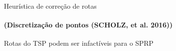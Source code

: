 \documentclass[12pt]{beamer}
\begin{document}
\begin{frame}{Heur\'istica de corre\c{c}\~ao de rotas}
	
	\framesubtitle{(Discretiza\c{c}\~ao de pontos (SCHOLZ, et al. 2016))}
	\fboxsep=0pt
	Rotas do TSP podem ser infact\'iveis para o SPRP
	\noindent{}
\end{frame}
\end{document}
